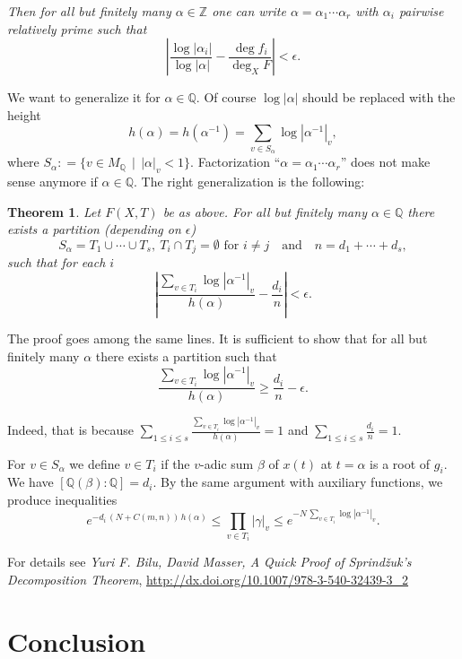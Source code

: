 \documentclass{article}
\newcommand{\dfn}{\mathrel{\mathop:}=}
\newcommand{\ZZ}{\mathbb{Z}}
\newcommand{\QQ}{\mathbb{Q}}
\theoremstyle{myplain}
\newtheorem{theorem}[proposition]{Theorem}
\theoremstyle{mydefinition}
\begin{document}
\emph{Then for all but finitely many $\alpha \in \ZZ$ one can write
  $\alpha = \alpha_1 \cdots \alpha_r$ with $\alpha_i$ pairwise relatively prime
  such that}
\[ \left| \frac{\log |\alpha_i|}{\log |\alpha|} - \frac{\deg f_i}{\deg_X F} \right| < \epsilon. \]

\vspace{1em}

We want to generalize it for $\alpha \in \QQ$. Of course $\log |\alpha|$ should
be replaced with the height
$$h (\alpha) = h (\alpha^{-1}) = \sum_{v\in S_\alpha} \log |\alpha^{-1}|_v,$$
where $S_\alpha \dfn \{ v\in M_\QQ \,\mid\, |\alpha|_v < 1 \}$. Factorization
``$\alpha = \alpha_1 \cdots \alpha_r$'' does not make sense anymore if
$\alpha \in \QQ$. The right generalization is the following:

\begin{theorem}
  Let $F (X,T)$ be as above. For all but finitely many $\alpha \in \QQ$ there
  exists a partition (depending on $\epsilon$)
  \[ S_\alpha = T_1 \cup \cdots \cup T_s, ~
    T_i\cap T_j = \emptyset \text{ for } i\ne j
    \quad \text{and} \quad
    n = d_1 + \cdots + d_s, \]
  such that for each $i$
  $$\left| \frac{\sum_{v\in T_i} \log |\alpha^{-1}|_v}{h (\alpha)} - \frac{d_i}{n} \right| < \epsilon.$$
\end{theorem}

The proof goes among the same lines. It is sufficient to show that for all but
finitely many $\alpha$ there exists a partition such that
\[ \frac{\sum_{v\in T_i} \log |\alpha^{-1}|_v}{h (\alpha)} \ge \frac{d_i}{n} - \epsilon. \]

Indeed, that is because
$\sum_{1 \le i \le s} \frac{\sum_{v\in T_i} \log |\alpha^{-1}|_v}{h (\alpha)} = 1$
and $\sum_{1 \le i \le s} \frac{d_i}{n} = 1$.

For $v \in S_\alpha$ we define $v \in T_i$ if the $v$-adic sum $\beta$ of
$x (t)$ at $t = \alpha$ is a root of $g_i$. We have
$[\QQ (\beta) : \QQ] = d_i$. By the same argument with auxiliary functions, we
produce inequalities
\[ e^{-d_i \, (N + C(m,n))\,h (\alpha)} \le \prod_{v\in T_i} |\gamma|_v \le
  e^{-N \, \sum_{v \in T_i} \log |\alpha^{-1}|_v}. \]

For details see \emph{Yuri F. Bilu, David Masser, A Quick Proof of
  Sprind\v{z}uk's Decomposition Theorem},
\url{http://dx.doi.org/10.1007/978-3-540-32439-3_2}

\pagebreak

\section*{Conclusion}
\end{document}
